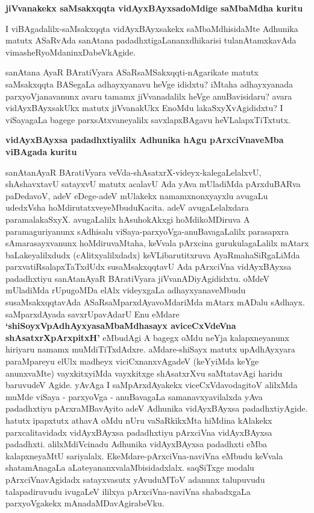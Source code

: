 {\bigskip
\noindent
{\large\bf jiVvanakekx saMsakxqqta vidAyxBAyxsadoMdige saMbaMdha kuritu}}\label{page38}
\medskip

\noindent
I viBAgadalilx-saMsakxqqta vidAyxBAyxsakekx saMbaMdhisidaMte Adhunika matutx ASaRvAda sanAtana padadhxti\-gaLa\-nanxdhi\-karisi tulanAtamxkavAda vimasheRyoMdaninxDabeVkAgide.

sanAtana AyaR BAratiVyara ASaRsaMSakxqqti-nAgarikate matutx saMsakxqqta BASegaLa adhayxyanavu heVge ididxtu? iMtaha adhayxyanada parxyoVjanavanunx avaru tamamx jiVvanadalilx heVge anuBavisidaru? avara vidAyxBAyxsakUkx matutx  jiVvanakUkx EnoMdu lakaSxyXvAgididxtu? I viSayagaLa bagege parxsAtxvaneyalilx savxlapxBAgavu heVLalapxTiTxtutx.

{\bigskip
\noindent
{\large\bf vidAyxBAyxsa padadhxtiyalilx Adhunika hAgu pArxciVnaveMba viBAgada kuritu}}\label{page38a}
\medskip

\noindent
sanAtanAyaR BAratiVyara veVda-shAsatxrX-videyx-kalegaLelalxvU, shAshavxtavU satayxvU matutx acalavU Ada yAva mUladiMda pArxduBARva paDedavoV, adeV eDege\--adeV mUlakekx namamxnonxyayxlu avu\-gaLu udedxVsha hoMdirutatxveyeMbudu\break Kacita. adeV avugaLelalxdara paramalakaSxyX. avugaLalilx hAsu\-hokAkxgi hoMdikoMDi\-ruva A paramaguriyanunx sAdhisalu viSaya-parxyoVga-anuBavagaLalilx para\-sapxra sAma\-rasayx\-vanunx hoMdiruvaMtaha, keVvala pArxcina gurukulagaLalilx mAtarx baLake\-yalilxdudx (cAlitx\-yalilxdadx) keVLi\-baru\-titxruva AyaRmahaSiRgaLiMda parxvatiRsa\-lapxTaTxdUdx susaMsakxqqtavU Ada pArxciVna vidAyx\-BAyxsa padadhx\-tiyu sanAtanAyaR BAratiVyara jiVvanADiyAgididxtu. oMdeV mUladiMda rUpu\-goMDa elAlx videyxgaLa adhayx\-yanaveMbudu susaMsakxqqtavAda ASaRsaMparxdAyavoMdariMda mAtarx mADalu sA\-dhayx. saMparx\-dAyada savxrUpavAdarU Enu eMdare {\bf `shiSoyxVpAdhAyxyasaMbaMdhasayx\label{38} aviceCxVdeVna shAsatxrX\-pArxpitxH'} eMbu\-dAgi A bagegx oMdu neYja kalapxneyanunx hiri\-yaru namamx muMdiTiTxdAdxre. aMdare-shiSayx matutx upA\-dhAyxyara paraMpareyu elUlx madheyx viciCxnanxvAgadeV (keYyiMda keYge anunxvaMte) vayxkitxyiMda vayxkitxge shAsatxrXvu saMtatavAgi haridu baruvudeV Agide. yAvAga I saMpArxdAyakekx viceCxVda\-voda\-gitoV alilxMda muMde viSaya - parxyoVga - anuBavagaLa samanavxyavilalxda yAva padadhxtiyu pArxraMBa\-vAyito adeV Adhunika vidAyx\-BAyxsa padadhxtiyAgide. hatutx ipapxtutx athavA oMdu nUru vaSaR\-kikxMta hiMdina kAlakekx parxcalitavidadx vidAyx\-BAyxsa padadhxtiyu pArxciVna vidAyxBAyxsa padadhxti. alilxMdiVcinadu Adhu\-nika vidAyx\-BAyxsa padadhxti eMba kalapxneyaMtU sariyalalx. EkeMdare-pArxciVna-naviVna \hbox{eMbudu} \hbox{keVvala} shata\-mAna\-gaLa aLate\-yananxva\-laMbi\-sidadxlalx. saqSiTxge modalu pArxciVnavAgidadx satayxvasutx yAvu\-duMToV adanunx talupuvudu talapadiru\-vudu ivugaLeV ililxya pArxciVna-naviVna shabadxgaLa parxyoVgakekx mAna\-daMDa\-vAgira\-beVku.

